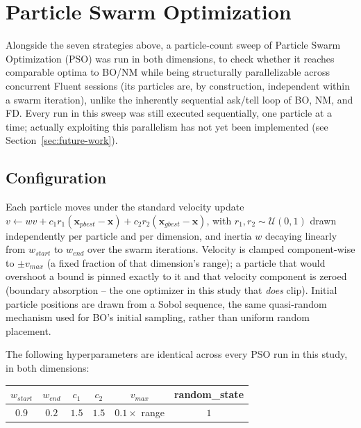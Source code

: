 \section{Particle Swarm Optimization}
\label{sec:pso}

Alongside the seven strategies above, a particle-count sweep of Particle Swarm
Optimization (PSO) was run in both dimensions, to check whether it reaches
comparable optima to BO/NM while being structurally parallelizable across
concurrent Fluent sessions (its particles are, by construction, independent
within a swarm iteration), unlike the inherently sequential ask/tell loop of
BO, NM, and FD. Every run in this sweep was still executed sequentially, one
particle at a time; actually exploiting this parallelism has not yet been
implemented (see Section~\ref{sec:future-work}).

\subsection{Configuration}
\label{sec:pso-config}

Each particle moves under the standard velocity update
$v \leftarrow w v + c_1 r_1 (\mathbf{x}_{pbest}-\mathbf{x}) + c_2 r_2 (\mathbf{x}_{gbest}-\mathbf{x})$,
with $r_1, r_2 \sim \mathcal{U}(0,1)$ drawn independently per particle and per
dimension, and inertia $w$ decaying linearly from $w_{start}$ to $w_{end}$ over
the swarm iterations. Velocity is clamped component-wise to
$\pm v_{max}$ (a fixed fraction of that dimension's range); a particle that
would overshoot a bound is pinned exactly to it and that velocity component is
zeroed (boundary absorption -- the one optimizer in this study that \emph{does}
clip). Initial particle positions are drawn from a Sobol sequence, the same
quasi-random mechanism used for BO's initial sampling, rather than uniform
random placement.

The following hyperparameters are identical across every PSO run in this
study, in both dimensions:

\begin{center}
\begin{tabular}{@{}cccccc@{}}
\toprule
$w_{start}$ & $w_{end}$ & $c_1$ & $c_2$ & $v_{max}$ & random\_state \\
\midrule
$0.9$ & $0.2$ & $1.5$ & $1.5$ & $0.1 \times$ range & $1$ \\
\bottomrule
\end{tabular}
\end{center}

